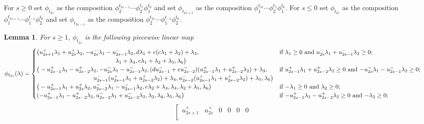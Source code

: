 \documentclass{amsart}
\newtheorem{lemma}[theorem]{Lemma}
\numberwithin{theorem}{section}
\begin{document}
\begin{landscape}
  For $s\ge0$ set $\phi_{t_{2s}}$ as the composition $\phi^{t_{2s-1}}_2\cdots\phi^{t_1}_2\phi^{t_0}_1$ and set $\phi_{t_{2s+1}}$ as the composition $\phi^{t_{2s}}_1\cdots\phi^{t_1}_2\phi^{t_0}_1$.
  For $s\le0$ set $\phi_{t_{2s}}$ as the composition $\phi^{t_{2s+1}}_1\cdots\phi^{t_{-1}}_1\phi^{t_0}_2$ and set $\phi_{t_{2s-1}}$ as the composition $\phi^{t_{2s}}_2\cdots\phi^{t_{-1}}_1\phi^{t_0}_2$.

  \begin{lemma}
    For $s\ge1$, $\phi_{t_{2s}}$ is the following piecewise linear map
    \begin{equation}
      \label{eq:even positive mutation map expression}
      \phi_{t_{2s}}(\lambda)
      =
      \begin{cases} 
        \big(u_{2s+1}^+\lambda_1+u_{2s}^+\lambda_2,-u_{2s}^-\lambda_1-u_{2s-1}^-\lambda_2,d\lambda_1+e(c\lambda_1+\lambda_2)+\lambda_3, & \text{if $\lambda_1 \ge 0$ and $u_{2s}^-\lambda_1+u_{2s-1}^-\lambda_2 \ge 0$;}\\
        \hspace{1.79in} \lambda_1+\lambda_4,c\lambda_1+\lambda_2+\lambda_5,\lambda_6\big) & \\
        \big(-u_{2s-1}^+\lambda_1-u_{2s-2}^+\lambda_2,-u_{2s}^-\lambda_1-u_{2s-1}^-\lambda_2,(du_{2s-1}^-+eu_{2s-2}^-)(u_{2s-1}^+\lambda_1+u_{2s-2}^+\lambda_2)+\lambda_3, & \text{if $u_{2s-1}^+\lambda_1+u_{2s-2}^+\lambda_2 \ge 0$ and $-u_{2s}^-\lambda_1-u_{2s-1}^-\lambda_2 \ge 0$;}\\
        \hspace{1.29in} u_{2s-1}^-(u_{2s-1}^+\lambda_1+u_{2s-2}^+\lambda_2)+\lambda_4,u_{2s-2}^-(u_{2s-1}^+\lambda_1+u_{2s-2}^+\lambda_2)+\lambda_5,\lambda_6\big) & \\
        \big(-u_{2s-1}^+\lambda_1+u_{2s}^+\lambda_2,u_{2s-2}^-\lambda_1-u_{2s-1}^-\lambda_2,e\lambda_2+\lambda_3,\lambda_4,\lambda_2+\lambda_5,\lambda_6\big) & \text{if $-\lambda_1 \ge 0$ and $\lambda_2 \ge 0$;}\\
        (-u_{2s-1}^+\lambda_1-u_{2s-2}^+\lambda_2,u_{2s-2}^-\lambda_1+u_{2s-3}^-\lambda_2,\lambda_3,\lambda_4,\lambda_5,\lambda_6\big) & \text{if $-u_{2s-1}^+\lambda_1-u_{2s-2}^+\lambda_2 \ge 0$ and $-\lambda_2 \ge 0$;}
      \end{cases}
    \end{equation}
    \[
      \left[\begin{array}{cccccc} 
        u_{2s+1}^+ & u_{2s}^+ & 0 & 0 & 0 & 0\\

\end{array}\]
\end{lemma}
\end{landscape}
\end{document}
